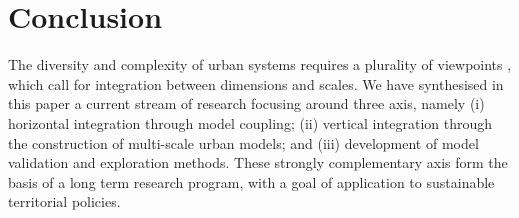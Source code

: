\section{Conclusion}

The diversity and complexity of urban systems requires a plurality of viewpoints \cite{pumain2020conclusion}, which call for integration between dimensions and scales. We have synthesised in this paper a current stream of research focusing around three axis, namely (i) horizontal integration through model coupling; (ii) vertical integration through the construction of multi-scale urban models; and (iii) development of model validation and exploration methods. These strongly complementary axis form the basis of a long term research program, with a goal of application to sustainable territorial policies.

\vspace{-0.6cm}







%

